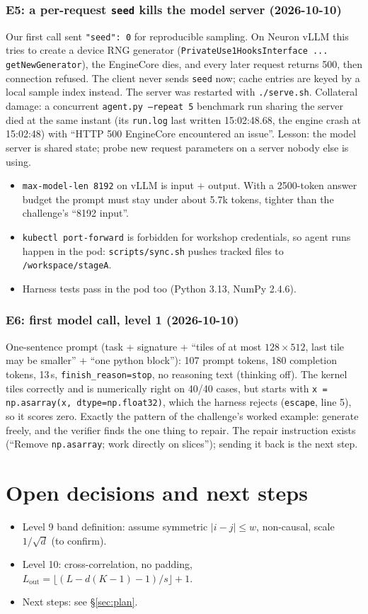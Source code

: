 \documentclass[11pt]{article}
\newcommand{\code}[1]{\texttt{#1}}
\newcommand{\entry}[2]{\subsubsection*{#1 \textnormal{\small(#2)}}}
\begin{document}
\entry{E5: a per-request \code{seed} kills the model server}{2026-10-10}
Our first call sent \code{"seed": 0} for reproducible sampling. On Neuron vLLM this tries to
create a device RNG generator (\code{PrivateUse1HooksInterface ... getNewGenerator}), the
EngineCore dies, and every later request returns 500, then connection refused. The client never
sends \code{seed} now; cache entries are keyed by a local sample index instead. The server was
restarted with \code{./serve.sh}. Collateral damage: a concurrent \code{agent.py --repeat 5}
benchmark run sharing the server died at the same instant (its \code{run.log} last written
15:02:48.68, the engine crash at 15:02:48) with ``HTTP 500 EngineCore encountered an issue''. Lesson:
the model server is shared state; probe new request parameters on a server nobody else is using.

\begin{itemize}
  \item \code{max-model-len 8192} on vLLM is input $+$ output. With a 2500-token answer budget
        the prompt must stay under about 5.7k tokens, tighter than the challenge's ``8192 input''.
  \item \code{kubectl port-forward} is forbidden for workshop credentials, so agent runs happen
        in the pod: \code{scripts/sync.sh} pushes tracked files to \code{/workspace/stageA}.
  \item Harness tests pass in the pod too (Python 3.13, NumPy 2.4.6).
\end{itemize}

\entry{E6: first model call, level 1}{2026-10-10}
One-sentence prompt (task + signature + ``tiles of at most $128\times512$, last tile may be
smaller'' + ``one python block''): 107 prompt tokens, 180 completion tokens, 13\,s,
\code{finish\_reason=stop}, no reasoning text (thinking off). The kernel tiles correctly and is
numerically right on 40/40 cases, but starts with \code{x = np.asarray(x, dtype=np.float32)},
which the harness rejects (\code{escape}, line 5), so it scores zero. Exactly the pattern of the
challenge's worked example: generate freely, and the verifier finds the one thing to repair. The
repair instruction exists (``Remove \code{np.asarray}; work directly on slices''); sending it back
is the next step.

\section{Open decisions and next steps}

\begin{itemize}
  \item Level 9 band definition: assume symmetric $|i-j|\le w$, non-causal, scale
        $1/\sqrt d$ (to confirm).
  \item Level 10: cross-correlation, no padding,
        $L_{\text{out}} = \lfloor (L - d(K-1) - 1)/s \rfloor + 1$.
  \item Next steps: see \S\ref{sec:plan}.
\end{itemize}
\end{document}
